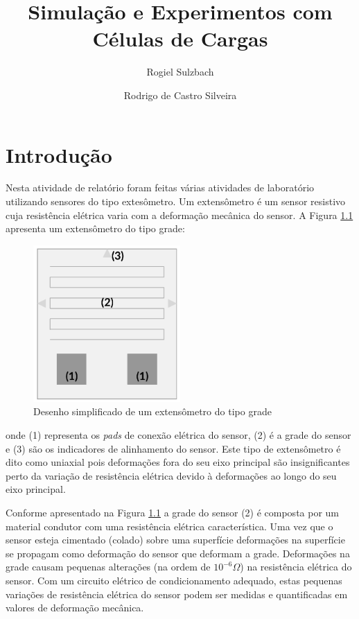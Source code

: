 \documentclass[a4paper]{instrumentacao}
\title{Simulação e Experimentos com Células de Cargas}
\author{Rogiel Sulzbach \and Rodrigo de Castro Silveira}
\institute{}
\begin{document}
\maketitle

\chapter{Introdução}

Nesta atividade de relatório foram feitas várias atividades de laboratório utilizando sensores do tipo extesômetro. Um extensômetro é um sensor resistivo cuja resistência elétrica varia com a deformação mecânica do sensor. A Figura \ref{fig:intro-extensometro} apresenta um extensômetro do tipo grade:

\begin{figure}[H]
\center
\includegraphics[width=0.5\textwidth]{ExtensometroGrade.pdf}
\caption{Desenho simplificado de um extensômetro do tipo grade}
\label{fig:intro-extensometro}
\end{figure}

\noindent onde (1) representa os \textit{pads} de conexão elétrica do sensor, (2) é a grade do sensor e (3) são os indicadores de alinhamento do sensor. Este tipo de extensômetro é dito como uniaxial pois deformações fora do seu eixo principal são insignificantes perto da variação de resistência elétrica devido à deformações ao longo do seu eixo principal.

Conforme apresentado na Figura \ref{fig:intro-extensometro} a grade do sensor (2) é composta por um material condutor com uma resistência elétrica característica. Uma vez que o sensor esteja cimentado (colado) sobre uma superfície deformações na superfície se propagam como deformação do sensor que deformam a grade. Deformações na grade causam pequenas alterações (na ordem de $10^{-6} \Omega$) na resistência elétrica do sensor. Com um circuito elétrico de condicionamento adequado, estas pequenas variações de resistência elétrica do sensor podem ser medidas e quantificadas em valores de deformação mecânica.
\end{document}
